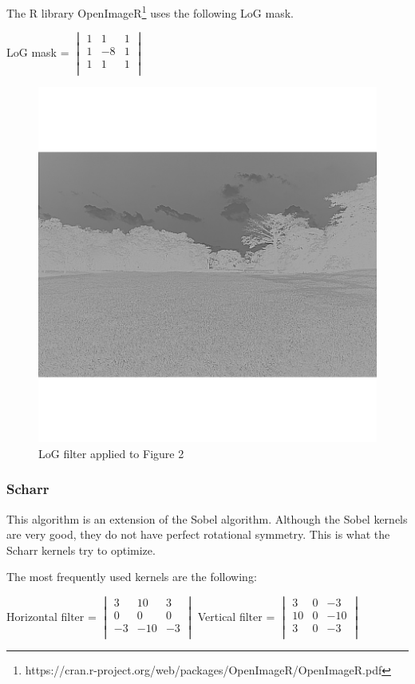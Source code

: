 \documentclass[12pt]{article}
\begin{document}
The R library OpenImageR\footnote{https://cran.r-project.org/web/packages/OpenImageR/OpenImageR.pdf} uses the following LoG mask.
\newline

LoG mask = $\begin{vmatrix}
        1 & 1 & 1\\
        1 & -8 & 1\\
        1 & 1 & 1\\
\end{vmatrix}$

\begin{figure}[h]
\centering
\includegraphics[scale = 0.45]{img/landscape_LoG}
\caption{LoG filter applied to Figure 2}
\end{figure}
\newpage

\subsubsection{Scharr}
This algorithm is an extension of the Sobel algorithm. Although the Sobel kernels are very good, they do not have perfect rotational symmetry. This is what the Scharr kernels try to optimize.
\newline

The most frequently used kernels are the following:
\newline

Horizontal filter = $\begin{vmatrix}
        3 & 10 & 3\\
        0 & 0 & 0\\
        -3 & -10 & -3\\
\end{vmatrix}$\hspace{11mm}
Vertical filter = $\begin{vmatrix}
        3 & 0 & -3\\
        10 & 0 & -10\\
        3 & 0 & -3\\
\end{vmatrix}$\hspace{5mm}
\end{document}
